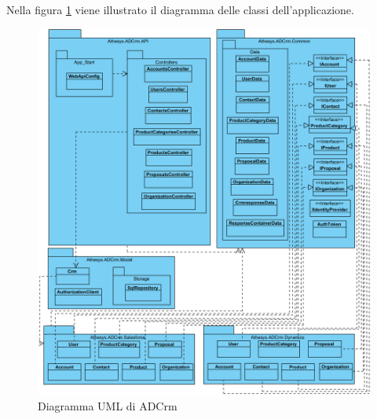 Nella figura \ref{fig:modulesdiagram} viene illustrato il diagramma  delle classi dell'applicazione.


\begin{figure}[H]
	\centering
	\includegraphics[width=\linewidth]{images/general2}
	\caption{Diagramma UML di ADCrm}
	\label{fig:modulesdiagram}
\end{figure}

